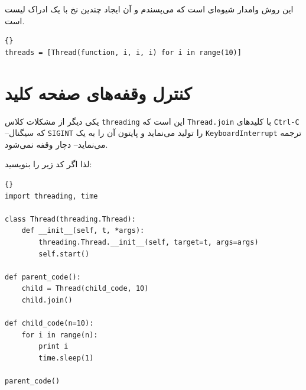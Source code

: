 \documentclass{book}
\begin{document}
    این روش وامدار شیوه‌ای است که می‌پسندم  و آن ایجاد چندین نخ با یک ادراک لیست است. 
    
    

\begin{latin}
\begin{lstlisting}[title=\rl{مثال چند نخی}]{}
threads = [Thread(function, i, i, i) for i in range(10)]
\end{lstlisting}
\end{latin}

\section{کنترل وقفه‌های صفحه کلید}

    یکی دیگر از مشکلات کلاس {\tt threading} این است که {\tt Thread.join} با کلیدهای {\tt Ctrl-C} --که سیگنال  {\tt SIGINT} را تولید می‌نماید 
     و  پایتون آن را به یک {\tt KeyboardInterrupt} ترجمه می‌نماید-- دچار وقفه نمی‌شود. 
    

\newpage
    لذا اگر کد زیر را بنویسید: 

\begin{latin}
\begin{lstlisting}[title=\rl{برنامه توقف‌ناپذیر}]{}
import threading, time

class Thread(threading.Thread):
    def __init__(self, t, *args):
        threading.Thread.__init__(self, target=t, args=args)
        self.start()

def parent_code():
    child = Thread(child_code, 10)
    child.join()

def child_code(n=10):
    for i in range(n):
        print i
        time.sleep(1)
    
parent_code()
\end{lstlisting}
\end{latin}
\end{document}
